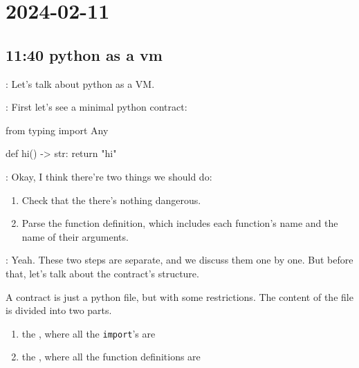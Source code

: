\section*{2024-02-11}

\subsection*{11:40 python as a vm}
: Let's talk about python as a VM.

 : First let's see a minimal python contract:

\begin{simplepy}
from typing import Any

def hi() -> str:
    return "hi"

\end{simplepy}

 : Okay, I think there're two things we should do:

\begin{enumerate}
\item Check that the there's nothing dangerous.
\item Parse the function definition, which includes each function's name and the
  name of their arguments.
\end{enumerate}

: Yeah. These two steps are separate, and we discuss them one by one. But before that,
let's talk about the contract's structure.

A contract is just a python file, but with some restrictions. The content of the
file is divided into two parts.

\begin{enumerate}
\item the , where all the \texttt{import}'s are
\item the , where all the function definitions are
\end{enumerate}

\begin{center}
\end{center}

